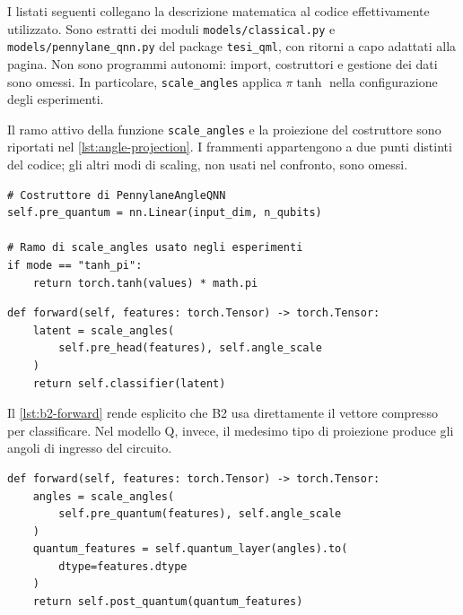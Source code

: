 I listati seguenti collegano la descrizione matematica al codice
effettivamente utilizzato. Sono estratti dei moduli
\texttt{models/classical.py} e \texttt{models/pennylane\_qnn.py}
del package \texttt{tesi\_qml}, con ritorni a capo adattati alla pagina.
Non sono programmi autonomi: import, costruttori e gestione dei dati
sono omessi. In particolare, \texttt{scale\_angles} applica
\(\pi\tanh\) nella configurazione degli esperimenti.

Il ramo attivo della funzione \texttt{scale\_angles} e la proiezione
del costruttore sono riportati nel \cref{lst:angle-projection}.
I frammenti appartengono a due punti distinti del codice; gli altri
modi di scaling, non usati nel confronto, sono omessi.

\begin{code}
\begin{verbatim}
# Costruttore di PennylaneAngleQNN
self.pre_quantum = nn.Linear(input_dim, n_qubits)

# Ramo di scale_angles usato negli esperimenti
if mode == "tanh_pi":
    return torch.tanh(values) * math.pi
\end{verbatim}
\caption{Proiezione da 512 feature a \(q\) componenti e conversione
in angoli. Commenti aggiunti per distinguere i due estratti.}
\label{lst:angle-projection}
\end{code}

\begin{code}
\begin{verbatim}
def forward(self, features: torch.Tensor) -> torch.Tensor:
    latent = scale_angles(
        self.pre_head(features), self.angle_scale
    )
    return self.classifier(latent)
\end{verbatim}
\caption{Forward del controllo classico B2.}
\label{lst:b2-forward}
\end{code}

Il \cref{lst:b2-forward} rende esplicito che B2 usa direttamente il
vettore compresso per classificare. Nel modello Q, invece, il medesimo
tipo di proiezione produce gli angoli di ingresso del circuito.

\begin{code}
\begin{verbatim}
def forward(self, features: torch.Tensor) -> torch.Tensor:
    angles = scale_angles(
        self.pre_quantum(features), self.angle_scale
    )
    quantum_features = self.quantum_layer(angles).to(
        dtype=features.dtype
    )
    return self.post_quantum(quantum_features)
\end{verbatim}
\caption{Forward della testa ibrida, condiviso da Q e QF.}
\label{lst:q-forward}
\end{code}

